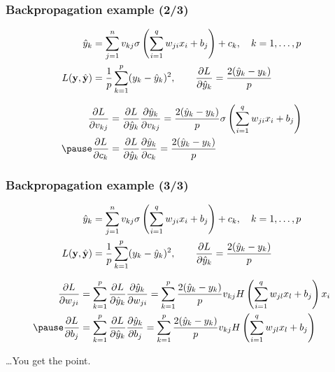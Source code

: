 \begin{frame}
    \frametitle{Backpropagation example (2/3)}

    \begin{block}{}
        \vspace{-1em}
        \begin{align*}
            \hat{y}_k &= \sum_{j=1}^n v_{kj} \sigma\left(\sum_{i=1}^q w_{ji} x_i + b_j\right) + c_k,
            \quad
            k = 1, \ldots, p \\
            L(\mathbf{y}, \hat{\mathbf{y}}) &= \frac{1}{p} \sum_{k=1}^p (y_k - \hat{y}_k)^2, \qquad
            \dfrac{\partial L}{\partial \hat{y}_k} = \frac{2 (\hat{y}_k - y_k)}{p}
        \end{align*}
    \end{block}
    \pause

    \begin{align*}
        \p{L}{v_{kj}} &= \p{L}{\hat{y}_k} \p{\hat{y}_k}{v_{kj}}
        = \frac{2 (\hat{y}_k - y_k)}{p} \sigma\left(\sum_{i=1}^q w_{ji} x_i + b_j\right) \\
        \pause
        \p{L}{c_k} &= \p{L}{\hat{y}_k} \p{\hat{y}_k}{c_k}
        = \frac{2 (\hat{y}_k - y_k)}{p}
    \end{align*}
\end{frame}

\begin{frame}
    \frametitle{Backpropagation example (3/3)}

    \begin{block}{}
        \vspace{-1em}
        \begin{align*}
            \hat{y}_k &= \sum_{j=1}^n v_{kj} \sigma\left(\sum_{i=1}^q w_{ji} x_i + b_j\right) + c_k,
            \quad
            k = 1, \ldots, p \\
            L(\mathbf{y}, \hat{\mathbf{y}}) &= \frac{1}{p} \sum_{k=1}^p (y_k - \hat{y}_k)^2, \qquad
            \dfrac{\partial L}{\partial \hat{y}_k} = \frac{2 (\hat{y}_k - y_k)}{p}
        \end{align*}
    \end{block}
    \pause

    \begin{align*}
        \p{L}{w_{ji}} &= \sum_{k=1}^p \p{L}{\hat{y}_k} \p{\hat{y}_k}{w_{ji}}
        = \sum_{k=1}^p \frac{2 (\hat{y}_k - y_k)}{p} v_{kj} H\left(\sum_{i=1}^q w_{jl} x_l + b_j\right) x_i \\
        \pause
        \p{L}{b_j} &= \sum_{k=1}^p \p{L}{\hat{y}_k} \p{\hat{y}_k}{b_j}
        = \sum_{k=1}^p \frac{2 (\hat{y}_k - y_k)}{p} v_{kj} H\left(\sum_{i=1}^q w_{jl} x_l + b_j\right)
    \end{align*}

    \ldots You get the point.
\end{frame}

